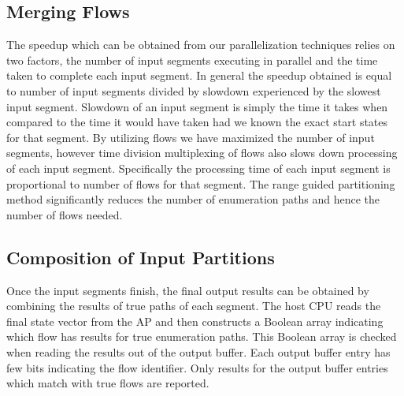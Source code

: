 \subsection{Merging Flows}
The speedup which can be obtained from our parallelization techniques relies on two factors, the number of input segments executing
in parallel and the time taken to complete each input segment. In
general the speedup obtained is equal to number of input segments
divided by slowdown experienced by the slowest input segment.
Slowdown of an input segment is simply the time it takes when
compared to the time it would have taken had we known the exact
start states for that segment.
By utilizing flows we have maximized the number of input segments, however time division multiplexing of flows also slows down
processing of each input segment. Specifically the processing time
of each input segment is proportional to number of flows for that
segment. The range guided partitioning method significantly reduces
the number of enumeration paths and hence the number of flows
needed.

\subsection{Composition of Input Partitions}
Once the input segments finish, the final output results can be obtained by combining the results of true paths of each segment. The
host CPU reads the final state vector from the AP and then constructs a Boolean array indicating which flow has results for true
enumeration paths. This Boolean array is checked when reading the
results out of the output buffer. Each output buffer entry has few
bits indicating the flow identifier. Only results for the output buffer
entries which match with true flows are reported.

